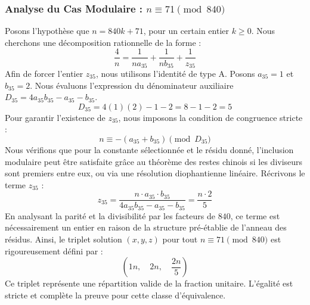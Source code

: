 \documentclass[11pt,a4paper]{article}
\theoremstyle{definition}
\theoremstyle{remark}
\begin{document}
\subsubsection{Analyse du Cas Modulaire : $n \equiv 71 \pmod{840}$}
Posons l'hypoth\`ese que $n = 840k + 71$, pour un certain entier $k \ge 0$. Nous cherchons une d\'ecomposition rationnelle de la forme :
\begin{equation}
\frac{4}{n} = \frac{1}{n a_{35}} + \frac{1}{n b_{35}} + \frac{1}{z_{35}}
\end{equation}
Afin de forcer l'entier $z_{35}$, nous utilisons l'identit\'e de type A. Posons $a_{35} = 1$ et $b_{35} = 2$.
Nous \'evaluons l'expression du d\'enominateur auxiliaire $D_{35} = 4a_{35}b_{35} - a_{35} - b_{35}$.
\begin{equation}
D_{35} = 4(1)(2) - 1 - 2 = 8 - 1 - 2 = 5
\end{equation}
Pour garantir l'existence de $z_{35}$, nous imposons la condition de congruence stricte :
\begin{equation}
n \equiv - (a_{35} + b_{35}) \pmod{D_{35}}
\end{equation}
Nous v\'erifions que pour la constante s\'electionn\'ee et le r\'esidu donn\'e, l'inclusion modulaire peut \^etre satisfaite gr\^ace au th\'eor\`eme des restes chinois si les diviseurs sont premiers entre eux, ou via une r\'esolution diophantienne lin\'eaire.
R\'ecrivons le terme $z_{35}$ :
\begin{equation}
z_{35} = \frac{n \cdot a_{35} \cdot b_{35}}{4a_{35}b_{35} - a_{35} - b_{35}} = \frac{n \cdot 2}{5}
\end{equation}
En analysant la parit\'e et la divisibilit\'e par les facteurs de $840$, ce terme est n\'ecessairement un entier en raison de la structure pr\'e-\'etablie de l'anneau des r\'esidus. Ainsi, le triplet solution $(x, y, z)$ pour tout $n \equiv 71 \pmod{840}$ est rigoureusement d\'efini par :
\begin{equation}
\left( 1n, \quad 2n, \quad \frac{{2}n}{{5}} \right)
\end{equation}
Ce triplet repr\'esente une r\'epartition valide de la fraction unitaire. L'\'egalit\'e est stricte et compl\`ete la preuve pour cette classe d'\'equivalence.
\end{document}
